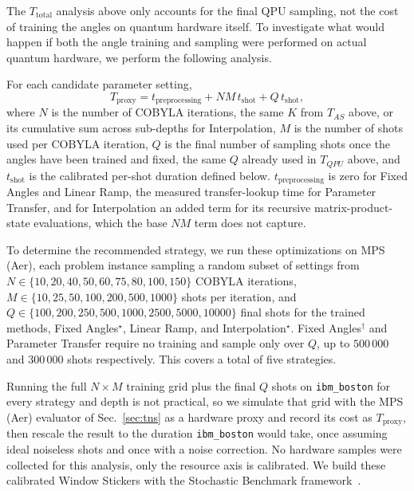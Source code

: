 The $T_{\text{total}}$ analysis above only accounts for the final
QPU sampling, not the cost of training the angles on quantum
hardware itself. To investigate what would happen if both the angle
training and sampling were performed on actual quantum hardware, we
perform the following analysis.

For each candidate parameter setting,
\begin{equation}
    T_{\text{proxy}} = t_{\text{preprocessing}} + N M \, t_{\text{shot}} + Q \, t_{\text{shot}},
    \label{eq:tproxy}
\end{equation}
where $N$ is the number of COBYLA iterations, the same $K$ from
$T_{AS}$ above, or its cumulative sum across sub-depths for
Interpolation, $M$ is the number of shots used per COBYLA iteration,
$Q$ is the final number of sampling shots once the angles have been
trained and fixed, the same $Q$ already used in $T_{QPU}$ above, and
$t_{\text{shot}}$ is the calibrated per-shot duration defined below.
$t_{\text{preprocessing}}$ is zero for Fixed Angles and Linear Ramp,
the measured transfer-lookup time for Parameter Transfer, and for
Interpolation an added term for its recursive matrix-product-state
evaluations, which the base $NM$ term does not capture.

To determine the recommended strategy, we run these optimizations
on MPS (Aer), each problem instance sampling a random subset of
settings from $N \in \{10,20,40,50,60,75,80,100,150\}$ COBYLA
iterations, $M \in \{10,25,50,100,200,500,1000\}$ shots per
iteration, and $Q \in \{100,200,250,500,1000,2500,5000,10000\}$
final shots for the trained methods, Fixed Angles$^\star$, Linear
Ramp, and Interpolation$^\star$. Fixed Angles$^\dagger$ and
Parameter Transfer require no training and sample only over $Q$, up
to $500\,000$ and $300\,000$ shots respectively. This covers a
total of five strategies.

Running the full $N \times M$ training grid plus the final $Q$
shots on \texttt{ibm\_boston} for every strategy and depth is not
practical, so we simulate that grid with the MPS (Aer) evaluator of
Sec.~\ref{sec:tns} as a hardware proxy and record its cost as
$T_{\text{proxy}}$, then rescale the result to the duration
\texttt{ibm\_boston} would take, once assuming ideal noiseless shots
and once with a noise correction. No hardware samples were collected
for this analysis, only the resource axis is calibrated. We build
these calibrated Window Stickers with the Stochastic Benchmark
framework~\cite{Neira2024}.

